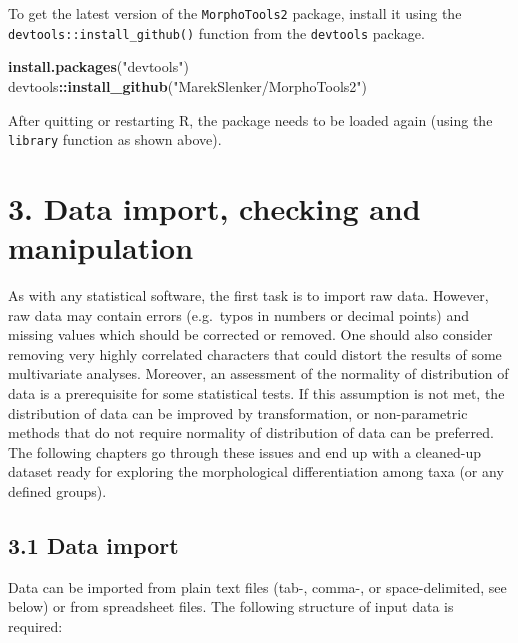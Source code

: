 \documentclass[
]{article}
\newenvironment{Shaded}{\begin{snugshade}}{\end{snugshade}}
\newcommand{\KeywordTok}[1]{\textcolor[rgb]{0.13,0.29,0.53}{\textbf{#1}}}
\newcommand{\NormalTok}[1]{#1}
\newcommand{\OperatorTok}[1]{\textcolor[rgb]{0.81,0.36,0.00}{\textbf{#1}}}
\newcommand{\StringTok}[1]{\textcolor[rgb]{0.31,0.60,0.02}{#1}}
\begin{document}
To get the latest version of the \texttt{MorphoTools2} package, install
it using the \texttt{devtools::install\_github()} function from the
\texttt{devtools} package.

\begin{Shaded}
\begin{Highlighting}[]
\KeywordTok{install.packages}\NormalTok{(}\StringTok{"devtools"}\NormalTok{)}
\NormalTok{devtools}\OperatorTok{::}\KeywordTok{install_github}\NormalTok{(}\StringTok{"MarekSlenker/MorphoTools2"}\NormalTok{)}
\end{Highlighting}
\end{Shaded}

After quitting or restarting R, the package needs to be loaded again
(using the \texttt{library} function as shown above).

\newpage

\hypertarget{data-import-checking-and-manipulation}{%
\section{3. Data import, checking and
manipulation}\label{data-import-checking-and-manipulation}}

As with any statistical software, the first task is to import raw data.
However, raw data may contain errors (e.g.~typos in numbers or decimal
points) and missing values which should be corrected or removed. One
should also consider removing very highly correlated characters that
could distort the results of some multivariate analyses. Moreover, an
assessment of the normality of distribution of data is a prerequisite
for some statistical tests. If this assumption is not met, the
distribution of data can be improved by transformation, or
non-parametric methods that do not require normality of distribution of
data can be preferred. The following chapters go through these issues
and end up with a cleaned-up dataset ready for exploring the
morphological differentiation among taxa (or any defined groups).

\hypertarget{data-import}{%
\subsection{3.1 Data import}\label{data-import}}

Data can be imported from plain text files (tab-, comma-, or
space-delimited, see below) or from spreadsheet files. The following
structure of input data is required:\\
\vspace*{-0.7pc}
\end{document}
